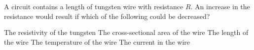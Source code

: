 \begin{questions}\setcounter{question}{0}\question
A circuit contains a length of tungsten wire with resistance $R$. An increase in the resistance would result if which of the following could be decreased?

\begin{choices}
\choice The resistivity of the tungsten
\choice The cross-sectional area of the wire
\choice The length of the wire
\choice The temperature of the wire
\choice The current in the wire
\end{choices}\end{questions}

